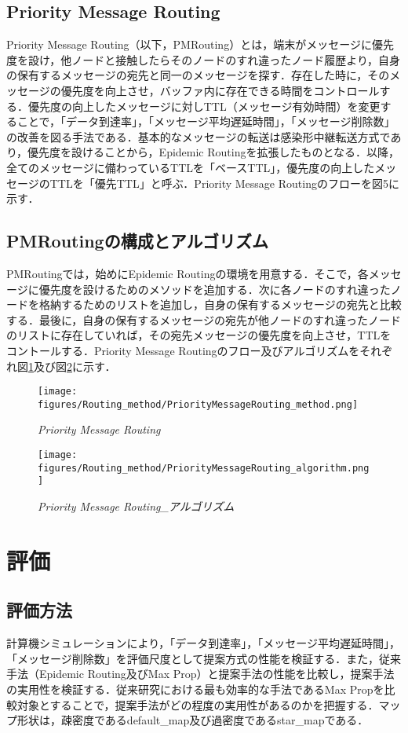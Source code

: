 \documentclass[11pt]{icsthesis}
\begin{document}
\section{Priority Message Routing}
Priority Message Routing（以下，PMRouting）とは，端末がメッセージに優先度を設け，他ノードと接触したらそのノードのすれ違ったノード履歴より，自身の保有するメッセージの宛先と同一のメッセージを探す．存在した時に，そのメッセージの優先度を向上させ，バッファ内に存在できる時間をコントロールする．優先度の向上したメッセージに対しTTL（メッセージ有効時間）を変更することで，「データ到達率」，「メッセージ平均遅延時間」，「メッセージ削除数」の改善を図る手法である．基本的なメッセージの転送は感染形中継転送方式であり，優先度を設けることから，Epidemic Routingを拡張したものとなる．以降，全てのメッセージに備わっているTTLを「ベースTTL」，優先度の向上したメッセージのTTLを「優先TTL」と呼ぶ．Priority Message Routingのフローを図5に示す．

\section{PMRoutingの構成とアルゴリズム}
PMRoutingでは，始めにEpidemic Routingの環境を用意する．そこで，各メッセージに優先度を設けるためのメソッドを追加する．次に各ノードのすれ違ったノードを格納するためのリストを追加し，自身の保有するメッセージの宛先と比較する．最後に，自身の保有するメッセージの宛先が他ノードのすれ違ったノードのリストに存在していれば，その宛先メッセージの優先度を向上させ，TTLをコントールする．Priority Message Routingのフロー及びアルゴリズムをそれぞれ図\ref{PriorityMessageRouting}及び図\ref{PriorityMessageRoutingalgo}に示す．

\begin{figure}[h]
	\centering
	\texttt{[image: figures/Routing\_method/PriorityMessageRouting\_method.png]}
	\caption[]{\it{Priority Message Routing}}
	\label{PriorityMessageRouting}
\end{figure}

\begin{figure}[h]
	\centering
	\texttt{[image: figures/Routing\_method/PriorityMessageRouting\_algorithm.png]}
	\caption[]{\it{Priority Message Routing\_アルゴリズム}}
	\label{PriorityMessageRoutingalgo}
\end{figure}

\chapter{評価}
\section{評価方法}
計算機シミュレーションにより，「データ到達率」，「メッセージ平均遅延時間」，「メッセージ削除数」を評価尺度として提案方式の性能を検証する．また，従来手法（Epidemic Routing及びMax Prop）と提案手法の性能を比較し，提案手法の実用性を検証する．従来研究における最も効率的な手法であるMax Propを比較対象とすることで，提案手法がどの程度の実用性があるのかを把握する．マップ形状は，疎密度であるdefault\_map及び過密度であるstar\_mapである．
\end{document}
